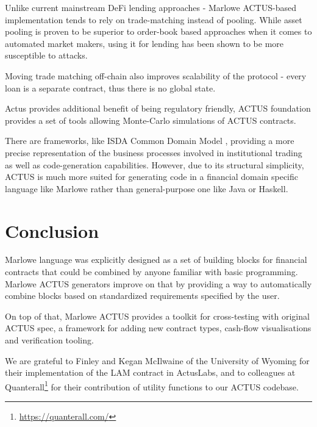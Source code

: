 \documentclass[runningheads]{llncs}
\begin{document}


Unlike current mainstream DeFi lending approaches - Marlowe ACTUS-based
implementation tends to rely on trade-matching instead of pooling.
While asset pooling is proven to be superior to order-book based approaches
when it comes to automated market makers, using it for lending has
been shown to be more susceptible to attacks\cite{flash-loan}.

Moving trade matching off-chain also improves scalability of the protocol
- every loan is a separate contract, thus there is no global state.

Actus provides additional benefit of being regulatory friendly, ACTUS
foundation provides a set of tools allowing Monte-Carlo simulations
of ACTUS contracts.

There are frameworks, like ISDA Common Domain Model \cite{isda-cdm}, providing a
more precise representation of the business processes involved in institutional trading 
as well as code-generation capabilities. However, due to its structural simplicity, ACTUS 
is much more suited for generating code in a financial domain specific language 
like Marlowe rather than general-purpose one like Java or Haskell.

\section{Conclusion}
\label{conclusion}

Marlowe language was explicitly designed as a set of building blocks
for financial contracts that could be combined by anyone familiar
with basic programming. Marlowe ACTUS generators improve on that by
providing a way to automatically combine blocks based on standardized
requirements specified by the user.

On top of that, Marlowe ACTUS provides a toolkit for cross-testing
with original ACTUS spec, a framework for adding new contract types,
cash-flow visualisations and verification tooling.

We are grateful to Finley and Kegan McIlwaine of the University of Wyoming for their implementation of the LAM contract in ActusLabs, and to colleagues at Quanterall\footnote{\url{https://quanterall.com/}} for their contribution of utility functions to our ACTUS codebase.

%
%
%


%
\end{document}

